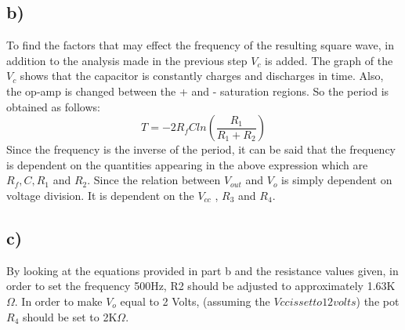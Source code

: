 \documentclass[letterpaper,12pt]{article}
\begin{document}
\subsection{b)}
To find the factors that may effect the frequency of the resulting square wave,  in addition to the analysis made in the previous step \(V_c\) is added. The graph of the \(V_c\) shows that the capacitor is constantly charges and discharges in time. Also, the op-amp is changed between the + and - saturation regions. So the period is obtained as follows:
\[
T = -2 R_f C  ln( \frac{R_1}{R_1+R_2})    
\]
Since the frequency is the inverse of the period, it can be said that the frequency is dependent on the quantities appearing in the above expression which are \(R_f , C , R_1 \) and \(R_2\). 
Since the relation between \(V_{out}\) and \(V_o\) is simply dependent on voltage division. It is dependent on the \(V_{cc}\) , \(R_3\) and \(R_4\). 
\subsection{c)}
By looking at the equations provided in part b and the resistance values given, in order to set the frequency 500Hz, R2 should be adjusted to approximately 1.63K\(\Omega\). In order to make \(V_o\) equal to 2 Volts, (assuming the \(V{cc} is set  to 12 volts\)) the pot \(R_4 \) should be set to 2K\(\Omega\).
\end{document}
